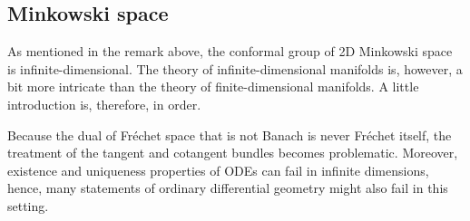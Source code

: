 
\subsection{Minkowski space}

    As mentioned in the remark above, the conformal group of 2D Minkowski space is infinite-dimensional. The theory of infinite-dimensional manifolds is, however, a bit more intricate than the theory of finite-dimensional manifolds. A little introduction is, therefore, in order.

    \begin{remark}
        Because the dual of Fr\'echet space that is not Banach is never Fr\'echet itself, the treatment of the tangent and cotangent bundles becomes problematic. Moreover, existence and uniqueness properties of ODEs can fail in infinite dimensions, hence, many statements of ordinary differential geometry might also fail in this setting.
    \end{remark}


